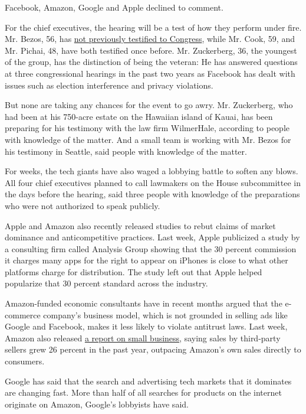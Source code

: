 Facebook, Amazon, Google and Apple declined to comment.

For the chief executives, the hearing will be a test of how they perform
under fire. Mr. Bezos, 56, has
\href{https://www.nytimes3xbfgragh.onion/2020/07/27/business/jeff-bezos-amazon-congress.html?action=click\&module=News\&pgtype=Homepage}{not
previously testified to Congress}, while Mr. Cook, 59, and Mr. Pichai,
48, have both testified once before. Mr. Zuckerberg, 36, the youngest of
the group, has the distinction of being the veteran: He has answered
questions at three congressional hearings in the past two years as
Facebook has dealt with issues such as election interference and privacy
violations.

But none are taking any chances for the event to go awry. Mr.
Zuckerberg, who had been at his 750-acre estate on the Hawaiian island
of Kauai, has been preparing for his testimony with the law firm
WilmerHale, according to people with knowledge of the matter. And a
small team is working with Mr. Bezos for his testimony in Seattle, said
people with knowledge of the matter.

For weeks, the tech giants have also waged a lobbying battle to soften
any blows. All four chief executives planned to call lawmakers on the
House subcommittee in the days before the hearing, said three people
with knowledge of the preparations who were not authorized to speak
publicly.

Apple and Amazon also recently released studies to rebut claims of
market dominance and anticompetitive practices. Last week, Apple
publicized a study by a consulting firm called Analysis Group showing
that the 30 percent commission it charges many apps for the right to
appear on iPhones is close to what other platforms charge for
distribution. The study left out that Apple helped popularize that 30
percent standard across the industry.

Amazon-funded economic consultants have in recent months argued that the
e-commerce company's business model, which is not grounded in selling
ads like Google and Facebook, makes it less likely to violate antitrust
laws. Last week, Amazon also released
\href{https://blog.aboutamazon.com/small-business/small-business-success-in-challenging-times}{a
report on small business}, saying sales by third-party sellers grew 26
percent in the past year, outpacing Amazon's own sales directly to
consumers.

Google has said that the search and advertising tech markets that it
dominates are changing fast. More than half of all searches for products
on the internet originate on Amazon, Google's lobbyists have said.

